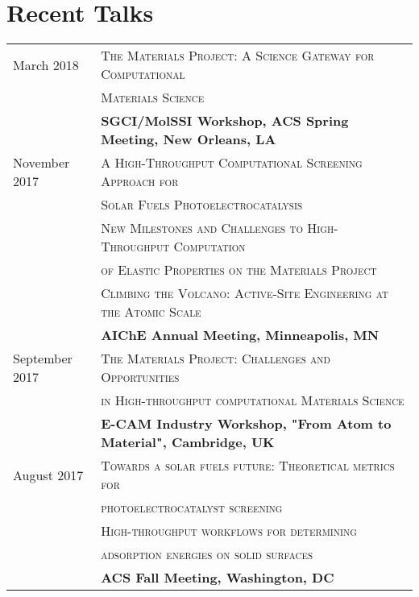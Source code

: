 \documentclass[a4paper,10pt]{article}
\begin{document}
\section{Recent Talks}
\begin{tabular}{ll}
March 2018 & \textsc{The Materials Project: A Science Gateway for Computational}\\
& \textsc{Materials Science} \vspace{0.04in} \\
& \textbf{SGCI/MolSSI Workshop, ACS Spring Meeting, New Orleans, LA} \vspace{0.1in} \\
November 2017 & \textsc{A High-Throughput Computational Screening Approach for}\\
& \textsc{Solar Fuels Photoelectrocatalysis} \vspace{0.02in} \\
&  \textsc{New Milestones and Challenges to High-Throughput Computation} \\ 
& \textsc{of Elastic Properties on the Materials Project} \vspace{0.02in} \\
& \textsc{Climbing the Volcano: Active-Site Engineering at the Atomic Scale} \vspace{0.04in}\\
& \textbf{AIChE Annual Meeting, Minneapolis, MN} \vspace{0.1in} \\
September 2017 & \textsc{The Materials Project: Challenges and Opportunities}\\
& \textsc{in High-throughput computational Materials Science} \vspace{0.04in} \\
& \textbf{E-CAM Industry Workshop, "From Atom to Material", Cambridge, UK} \vspace{0.1in} \\
August 2017 & \textsc{Towards a solar fuels future: Theoretical metrics for} \\
& \textsc{photoelectrocatalyst screening} \vspace{0.02in} \\
& \textsc{High-throughput workflows for determining} \\
& \textsc{adsorption energies on solid surfaces} \vspace{0.04in} \\
& \textbf{ACS Fall Meeting, Washington, DC} \vspace{0.1in} \\

\end{tabular}
\end{document}
